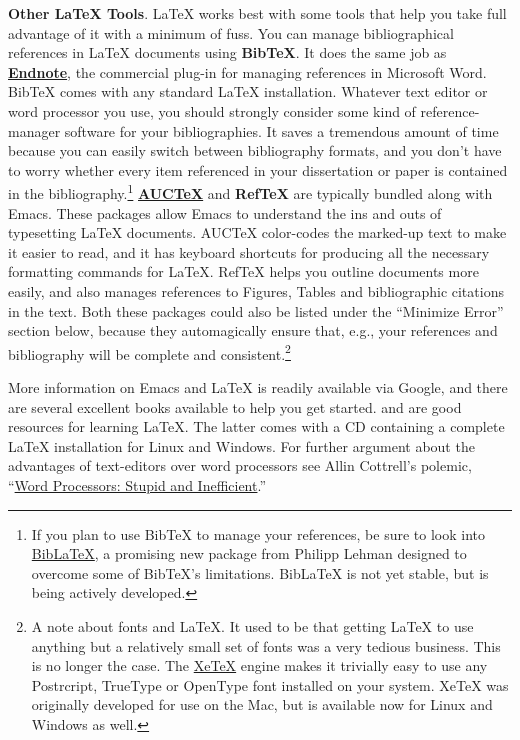 \documentclass[11pt,article]{memoir}
\begin{document}
\textbf{Other LaTeX Tools}. LaTeX works best with some tools that help you take full advantage of it with a minimum of fuss. You can manage bibliographical references in LaTeX documents using \textbf{BibTeX}. It does the same job as \href{http://www.endnote.com/}{\textbf{Endnote}}, the commercial plug-in for managing references in Microsoft Word. BibTeX comes with any standard LaTeX installation. Whatever text editor or word processor you use, you should strongly consider some kind of reference-manager software for your bibliographies. It saves a tremendous amount of time because you can easily switch between bibliography formats, and you don't have to worry whether every item referenced in your dissertation or paper is contained in the bibliography.\footnote{If you plan to use BibTeX to manage your references, be sure to look into \href{http://www.ctan.org/tex-archive/help/Catalogue/entries/biblatex.html}{BibLaTeX}, a promising new package from Philipp Lehman designed to overcome some of BibTeX's limitations. BibLaTeX is not yet stable, but is being actively developed.} \textbf{\href{http://www.gnu.org/software/auctex/}{AUCTeX}} and \textbf{RefTeX} are typically bundled along with Emacs. These packages allow Emacs to understand the ins and outs of typesetting LaTeX documents. AUCTeX color-codes the marked-up text to make it easier to read, and it has keyboard shortcuts for producing all the necessary formatting commands for LaTeX. RefTeX helps you outline documents more easily, and also manages references to Figures, Tables and bibliographic citations in the text. Both these packages could also be listed under the ``Minimize Error'' section below, because they automagically ensure that, e.g., your references and bibliography will be complete and consistent.\footnote{A note about fonts and LaTeX. It used to be that getting LaTeX to use anything but a relatively small set of fonts was a very tedious business. This is no longer the case. The \href{http://scripts.sil.org/cms/scripts/page.php?site_id=nrsi&id=xetex}{XeTeX} engine makes it trivially easy to use any Postrcript, TrueType or OpenType font installed on your system. XeTeX was originally developed for use on the Mac, but is available now for Linux and Windows as well.} 

More information on Emacs and LaTeX is readily available via Google, and there are several excellent books available to help you get started. \citet{kopka03:_guide_latex} and \citet{mittlebach04:_latex_compan} are good resources for learning LaTeX. The latter comes with a CD containing a complete LaTeX installation for Linux and Windows. For further argument about the advantages of text-editors over word processors see Allin Cottrell's polemic, ``\href{http://www.ecn.wfu.edu/~cottrell/wp.html}{Word Processors: Stupid and Inefficient}.''
     
\end{document}
